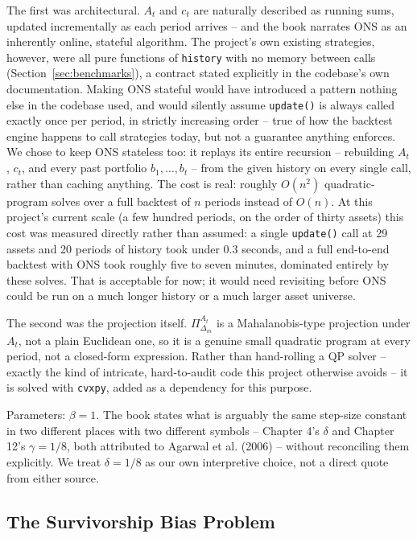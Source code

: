 \documentclass[11pt]{article}
\begin{document}
The first was architectural. $A_t$ and $c_t$ are naturally described as
running sums, updated incrementally as each period arrives -- and the
book narrates ONS as an inherently online, stateful algorithm. The
project's own existing strategies, however, were all pure functions of
\texttt{history} with no memory between calls (Section~\ref{sec:benchmarks}),
a contract stated explicitly in the codebase's own documentation. Making
ONS stateful would have introduced a pattern nothing else in the codebase
used, and would silently assume \texttt{update()} is always called exactly
once per period, in strictly increasing order -- true of how the backtest
engine happens to call strategies today, but not a guarantee anything
enforces. We chose to keep ONS stateless too: it replays its entire
recursion -- rebuilding $A_t$, $c_t$, and every past portfolio
$b_1, \dots, b_t$ -- from the given history on every single call, rather
than caching anything. The cost is real: roughly $O(n^2)$ quadratic-program
solves over a full backtest of $n$ periods instead of $O(n)$. At this
project's current scale (a few hundred periods, on the order of thirty
assets) this cost was measured directly rather than assumed: a single
\texttt{update()} call at 29 assets and 20 periods of history took under
0.3 seconds, and a full end-to-end backtest with ONS took roughly five to
seven minutes, dominated entirely by these solves. That is acceptable for
now; it would need revisiting before ONS could be run on a much longer
history or a much larger asset universe.

The second was the projection itself. $\Pi_{\Delta_m}^{A_t}$ is a
Mahalanobis-type projection under $A_t$, not a plain Euclidean one, so it
is a genuine small quadratic program at every period, not a closed-form
expression. Rather than hand-rolling a QP solver -- exactly the kind of
intricate, hard-to-audit code this project otherwise avoids -- it is
solved with \texttt{cvxpy}, added as a dependency for this purpose.

Parameters: $\beta = 1$. The book states what is arguably the same
step-size constant in two different places with two different symbols --
Chapter 4's $\delta$ and Chapter 12's $\gamma = 1/8$, both attributed to
Agarwal et al. (2006) -- without reconciling them explicitly. We treat
$\delta = 1/8$ as our own interpretive choice, not a direct quote from
either source.

\subsection{The Survivorship Bias Problem}
\label{sec:survivorship}
\end{document}
